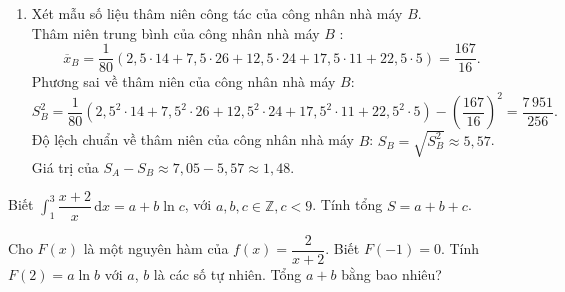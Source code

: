 \begin{ex}
{\begin{enumerate}[$\bullet$]
Thâm niên trung bình của công nhân nhà máy $A$ :
\[\overline{x}_A=\dfrac{1}{80}\left(2{,}5\cdot 35+7{,}5\cdot 13+12{,}5\cdot 12+17{,}5\cdot 12+22{,}5\cdot8\right)=\dfrac{145}{16}.\]
Phương sai về thâm niên của công nhân nhà máy $A$: \[S_A^2=\dfrac{1}{80}\left(2{,}5^2\cdot 35+7{,}5^2\cdot 13+12{,}5^2\cdot 12+17{,}5^2\cdot 12+22{,}5^2\cdot8\right)-\left(\dfrac{145}{16}\right)^2 =\dfrac{12\,735}{256}.\]
Độ lệch chuẩn  về thâm niên của công nhân nhà máy $A$: $S_A=\sqrt{S_A^2}\approx 7{,}05$.
\item Xét mẫu số liệu thâm niên công tác của công nhân nhà máy $B$.\\
Thâm niên trung bình của công nhân nhà máy $B$ :
\[\overline{x}_B=\dfrac{1}{80}\left(2{,}5\cdot 14+7{,}5\cdot 26+12{,}5\cdot 24+17{,}5\cdot 11+22{,}5\cdot5\right)=\dfrac{167}{16}.\]
Phương sai về thâm niên của công nhân nhà máy $B$: \[S_B^2=\dfrac{1}{80}\left(2{,}5^2\cdot 14+7{,}5^2\cdot 26+12{,}5^2\cdot 24+17{,}5^2\cdot 11+22{,}5^2\cdot 5\right)-\left(\dfrac{167}{16}\right)^2 =\dfrac{7\,951}{256}.\]
Độ lệch chuẩn  về thâm niên của công nhân nhà máy $B$: $S_B=\sqrt{S_B^2}\approx 5{,}57$.\\
Giá trị của $S_A-S_B\approx 7{,}05-5{,}57\approx 1{,}48$.
\end{enumerate}
}
\end{ex}

\begin{ex}%
Biết $\displaystyle\int_1^3\dfrac{x+2}{x} \mathrm{\,d}x=a+b\ln c$, với $a,b,c\in \mathbb{Z},c < 9$. Tính tổng $S=a+b+c$.
\end{ex}

\begin{ex}%
Cho $F(x)$ là một nguyên hàm của $f(x)=\dfrac{2}{x+2}$. Biết $F\left(-1\right)=0$. Tính $F(2)=a\ln b$ với $a$, $b$ là các số tự nhiên. Tổng $a+b$ bằng bao nhiêu?
\end{ex}

